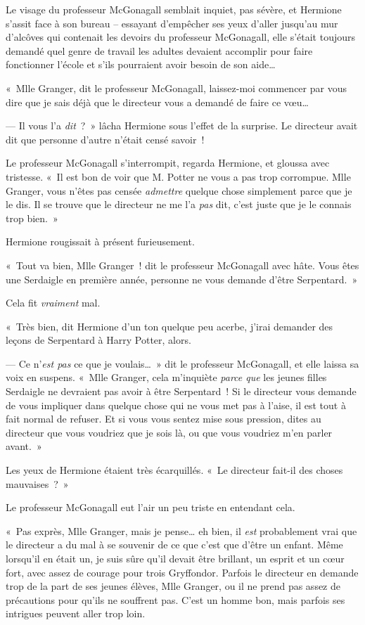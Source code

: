 Le visage du professeur McGonagall semblait inquiet, pas sévère, et Hermione s'assit face à son bureau -- essayant d'empêcher ses yeux d'aller jusqu'au mur d'alcôves qui contenait les devoirs du professeur McGonagall, elle s'était toujours demandé quel genre de travail les adultes devaient accomplir pour faire fonctionner l'école et s'ils pourraient avoir besoin de son aide…

«~Mlle Granger, dit le professeur McGonagall, laissez-moi commencer par vous dire que je sais déjà que le directeur vous a demandé de faire ce vœu…

--- Il vous l'a \emph{dit}~?~» lâcha Hermione sous l'effet de la surprise. Le directeur avait dit que personne d'autre n'était censé savoir~!

Le professeur McGonagall s'interrompit, regarda Hermione, et gloussa avec tristesse. «~Il est bon de voir que M. Potter ne vous a pas trop corrompue. Mlle Granger, vous n'êtes pas censée \emph{admettre} quelque chose simplement parce que je le dis. Il se trouve que le directeur ne me l'a \emph{pas} dit, c'est juste que je le connais trop bien.~»

Hermione rougissait à présent furieusement.

«~Tout va bien, Mlle Granger~! dit le professeur McGonagall avec hâte. Vous êtes une Serdaigle en première année, personne ne vous demande d'être Serpentard.~»

Cela fit \emph{vraiment} mal.

«~Très bien, dit Hermione d'un ton quelque peu acerbe, j'irai demander des leçons de Serpentard à Harry Potter, alors.

--- Ce n'\emph{est pas} ce que je voulais…~» dit le professeur McGonagall, et elle laissa sa voix en suspens. «~Mlle Granger, cela m'inquiète \emph{parce que} les jeunes filles Serdaigle ne devraient pas avoir à être Serpentard~! Si le directeur vous demande de vous impliquer dans quelque chose qui ne vous met pas à l'aise, il est tout à fait normal de refuser. Et si vous vous sentez mise sous pression, dites au directeur que vous voudriez que je sois là, ou que vous voudriez m'en parler avant.~»

Les yeux de Hermione étaient très écarquillés. «~Le directeur fait-il des choses mauvaises~?~»

Le professeur McGonagall eut l'air un peu triste en entendant cela.

«~Pas exprès, Mlle Granger, mais je pense… eh bien, il \emph{est} probablement vrai que le directeur a du mal à se souvenir de ce que c'est que d'être un enfant. Même lorsqu'il en était un, je suis sûre qu'il devait être brillant, un esprit et un cœur fort, avec assez de courage pour trois Gryffondor. Parfois le directeur en demande trop de la part de ses jeunes élèves, Mlle Granger, ou il ne prend pas assez de précautions pour qu'ils ne souffrent pas. C'est un homme bon, mais parfois ses intrigues peuvent aller trop loin.

